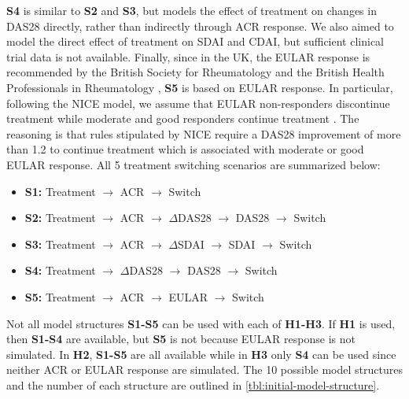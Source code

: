 \documentclass[11pt,final,fleqn]{article}\usepackage[]{graphicx}\usepackage[]{color}
\theoremstyle{plain}
\begin{document}
\textbf{S4} is similar to \textbf{S2} and \textbf{S3}, but models the effect of treatment on changes in DAS28 directly, rather than indirectly through ACR response. We also aimed to model the direct effect of treatment on SDAI and CDAI, but sufficient clinical trial data is not available. Finally, since in the UK, the EULAR response is recommended by the British Society for Rheumatology and the British Health Professionals in Rheumatology \citep{deighton2010bsr}, \textbf{S5} is based on EULAR response. In particular, following the NICE model, we assume that EULAR non-responders discontinue treatment while moderate and good responders continue treatment \citep{stevenson2016adalimumab}. The reasoning is that rules stipulated by NICE require a DAS28 improvement of more than 1.2 to continue treatment which is associated with moderate or good EULAR response. All 5 treatment switching scenarios are summarized below: 

\begin{itemize}
\item \textbf{S1:} Treatment $\rightarrow$ ACR $\rightarrow$ Switch
\item \textbf{S2:} Treatment $\rightarrow$ ACR $\rightarrow$ $\Delta$DAS28 $\rightarrow$ DAS28 $\rightarrow$ Switch 
\item \textbf{S3:} Treatment $\rightarrow$ ACR $\rightarrow$ $\Delta$SDAI $\rightarrow$ SDAI $\rightarrow$ Switch 
\item \textbf{S4:} Treatment $\rightarrow$ $\Delta$DAS28 $\rightarrow$ DAS28 $\rightarrow$ Switch 
\item \textbf{S5:} Treatment $\rightarrow$ ACR $\rightarrow$ EULAR $\rightarrow$ Switch
\end{itemize}

Not all model structures \textbf{S1-S5} can be used with each of \textbf{H1-H3}. If \textbf{H1} is used, then \textbf{S1-S4} are available, but \textbf{S5} is not because EULAR response is not simulated. In \textbf{H2}, \textbf{S1-S5} are all available while in \textbf{H3} only \textbf{S4} can be used since neither ACR or EULAR response are simulated. The 10 possible model structures and the number of each structure are outlined in \autoref{tbl:initial-model-structure}.  
\end{document}
